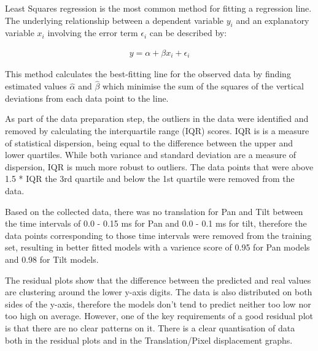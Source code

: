 \documentclass{l4proj}
\begin{document}
Least Squares regression is the most common method for fitting a regression line. The underlying relationship between a dependent variable $y_{i}$ and an explanatory variable $x_{i}$ involving the error term $\epsilon_{i}$ can be described by:

\begin{align}
y = \alpha + \beta x_{i} + \epsilon _{i}
\end{align}


This method calculates the best-fitting line for the observed data by finding estimated values $ \hat{\alpha} $ and $\hat{\beta}$ which minimise the sum of the squares of the vertical deviations from each data point to the line. 

As part of the data preparation step, the outliers in the data were identified and removed by calculating the interquartile range (IQR) scores. IQR is is a measure of statistical dispersion, being equal to the difference between the upper and lower quartiles. While both variance and standard deviation are a measure of dispersion, IQR is much more robust to outliers. The data points that  were above 1.5 * IQR the 3rd quartile and below the 1st quartile were removed from the data. 

Based on the collected data, there was no translation for Pan and Tilt between the time intervals of 0.0 - 0.15 ms for Pan and 0.0 - 0.1 ms for tilt, therefore the data points corresponding to those time intervals were removed from the training set, resulting in better fitted models with a varience score of 0.95 for Pan models and 0.98 for Tilt models. 

The residual plots show that the difference between the predicted and real values are clustering around the lower y-axis digits. The data is also distributed on both sides of the y-axis, therefore the models don't tend to predict neither too low nor too high on average. However, one of the key requirements of a good residual plot is that there are no clear patterns on it. There is a clear quantisation of data both in the residual plots and in the Translation/Pixel displacement graphs. 
\end{document}
